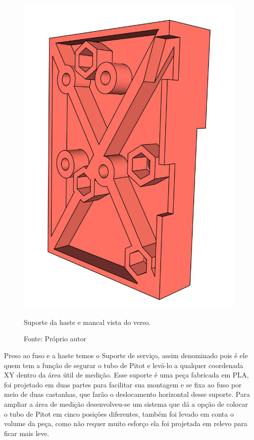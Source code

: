 \begin{figure}[H]
\centering
\includegraphics[scale = 0.4]{figuras/ressuportehastemancalfv}
\caption{Suporte da haste e mancal vista do verso.}
\caption*{Fonte: Próprio autor}
\label{fig:ressuportehastemancalfv}
\end{figure}

\pagebreak

Preso ao fuso e a haste temos o Suporte de serviço, assim denominado pois é ele quem 
tem a função de segurar o tubo de Pitot e levá-lo a qualquer coordenada XY dentro 
da área útil de medição. Esse suporte é uma peça fabricada em \ac{PLA}, foi projetado 
em duas partes para facilitar sua montagem e se fixa ao fuso por meio de duas castanhas, 
que farão o deslocamento horizontal desse suporte. Para ampliar a área de medição 
desenvolveu-se um sistema que dá a opção de colocar o tubo de Pitot em cinco posições diferentes, 
também foi levado em conta o volume da peça, como não requer muito esforço ela foi projetada 
em relevo para ficar mais leve.

